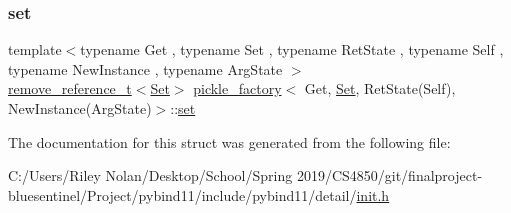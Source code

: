 \mbox{\label{structpickle__factory_3_01_get_00_01_set_00_01_ret_state_07_self_08_00_01_new_instance_07_arg_state_08_4_a34878fc57eb8c8e44d430aec5e439e64}} 
\subsubsection{\texorpdfstring{set}{set}}
{\footnotesize\ttfamily template$<$typename Get , typename Set , typename Ret\+State , typename Self , typename New\+Instance , typename Arg\+State $>$ \\
\mbox{\hyperlink{detail_2common_8h_a3a08cea569e6926ac8d7d74dd7178b5f}{remove\+\_\+reference\+\_\+t}}$<$\mbox{\hyperlink{_python-ast_8h_a8b39bad9fda6bc73af75e4d6085bcf91}{Set}}$>$ \mbox{\hyperlink{structpickle__factory}{pickle\+\_\+factory}}$<$ Get, \mbox{\hyperlink{_python-ast_8h_a8b39bad9fda6bc73af75e4d6085bcf91}{Set}}, Ret\+State(Self), New\+Instance(Arg\+State)$>$\+::\mbox{\hyperlink{classset}{set}}}



The documentation for this struct was generated from the following file\+:\begin{DoxyCompactItemize}
\item 
C\+:/\+Users/\+Riley Nolan/\+Desktop/\+School/\+Spring 2019/\+C\+S4850/git/finalproject-\/bluesentinel/\+Project/pybind11/include/pybind11/detail/\mbox{\hyperlink{init_8h}{init.\+h}}\end{DoxyCompactItemize}
